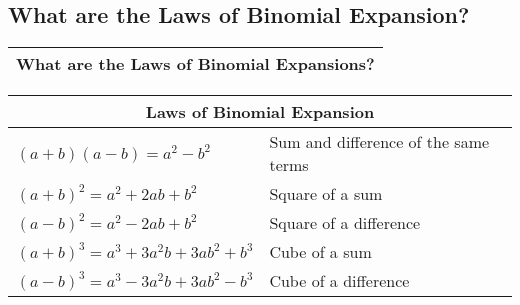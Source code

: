 \subsection{What are the Laws of Binomial Expansion?}
\begin{small}
    \begin{tabularx}{1\textwidth}{
            p{}
        }
        \toprule
        What are the Laws of Binomial Expansions?
        \\
        \bottomrule

    \end{tabularx}
\end{small}
\begin{small}
    \begin{tabularx}{1\textwidth}{
            p{}
            p{}
        }
        \toprule
        \multicolumn{2}{c}{\textbf{Laws of Binomial Expansion}} \\
        \midrule

        $ \left(a + b \right)\left(a - b \right) = a^{2} - b^{2} $
        &
        Sum and difference of the same terms
        \\
        \midrule

        $ \left(a + b \right)^{2} = a^{2} + 2ab + b^{2} $
        &
        Square of a sum
        \\
        \midrule

        $ \left(a - b \right)^{2} = a^{2} - 2ab + b^{2} $
        &
        Square of a difference
        \\
        \midrule

        $ \left(a + b \right)^{3} = a^{3} + 3a^{2}b + 3ab^{2} + b^{3} $
        &
        Cube of a sum
        \\
        \midrule

        $ \left(a - b \right)^{3} = a^{3} - 3a^{2}b + 3ab^{2} - b^{3} $
        &
        Cube of a difference
        \\
        \bottomrule

    \end{tabularx}
\end{small}
